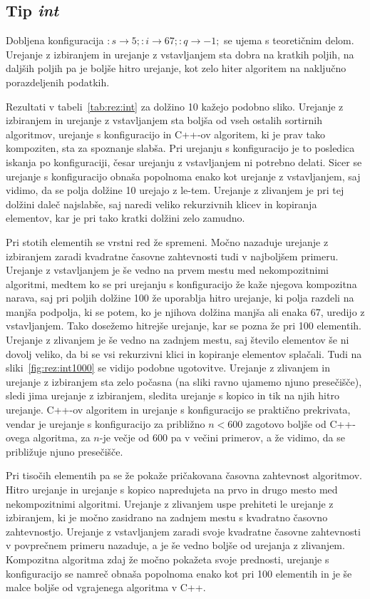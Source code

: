 \documentclass[a4paper,oneside,12pt]{article}
\newcommand{\lra}{\ensuremath{\longrightarrow}}
\begin{document}
\subsection{Tip \emph{int}}
Dobljena konfiguracija $:s \lra 5;:i \lra 67;:q \lra -1;$
se ujema s teoretičnim delom. Urejanje z izbiranjem in urejanje z vstavljanjem sta 
dobra na kratkih poljih, na daljših poljih pa je boljše hitro urejanje, kot zelo hiter algoritem na naključno
porazdeljenih podatkih. 

Rezultati v tabeli~\ref{tab:rez:int} za dolžino 10 kažejo podobno sliko. Urejanje z izbiranjem in urejanje 
z vstavljanjem sta boljša od vseh ostalih sortirnih algoritmov, urejanje s konfiguracijo in C++-ov 
algoritem, ki je prav tako kompoziten, sta za spoznanje slabša. Pri urejanju s konfiguracijo je to posledica
iskanja po konfiguraciji, česar urejanju z vstavljanjem ni potrebno delati. Sicer 
se urejanje s konfiguracijo obnaša popolnoma enako kot urejanje z vstavljanjem, saj vidimo, da se polja dolžine 
10 urejajo z le-tem. Urejanje z zlivanjem je pri tej dolžini daleč najslabše, saj naredi veliko 
rekurzivnih klicev in kopiranja elementov, kar je pri tako kratki dolžini zelo zamudno.

Pri stotih elementih se vrstni red že spremeni. Močno nazaduje urejanje z izbiranjem zaradi 
kvadratne časovne zahtevnosti tudi v najboljšem primeru. Urejanje z vstavljanjem je še vedno 
na prvem mestu med nekompozitnimi algoritmi, medtem ko se pri urejanju s konfiguracijo že kaže njegova
kompozitna narava, saj pri poljih dolžine 100 že uporablja hitro urejanje, ki polja razdeli na 
manjša podpolja, ki se potem, ko je njihova dolžina manjša ali enaka 67, uredijo z vstavljanjem.
Tako dosežemo hitrejše urejanje, kar se pozna že pri 100 elementih. Urejanje z zlivanjem je še 
vedno na zadnjem mestu, saj število elementov še ni dovolj veliko, da bi se vsi rekurzivni klici 
in kopiranje elementov splačali. Tudi na sliki~\ref{fig:rez:int1000} se vidijo
podobne ugotovitve. Urejanje z zlivanjem in urejanje z izbiranjem sta zelo
počasna (na sliki ravno ujamemo njuno presečišče), 
sledi jima urejanje z izbiranjem, sledita urejanje s kopico in tik na
njih hitro urejanje.  C++-ov algoritem in urejanje s konfiguracijo se praktično
prekrivata, vendar je urejanje s konfiguracijo za približno $n < 600$ zagotovo
boljše od C++-ovega algoritma, za $n$-je večje od 600 pa v večini primerov, a že
vidimo, da se približuje njuno presečišče.

Pri tisočih elementih pa se že pokaže pričakovana časovna zahtevnost algoritmov. Hitro urejanje in urejanje
s kopico napredujeta na prvo in drugo mesto med nekompozitnimi algoritmi. Urejanje z zlivanjem uspe 
prehiteti le urejanje z izbiranjem, ki je močno zasidrano na zadnjem mestu s kvadratno časovno 
zahtevnostjo. Urejanje z vstavljanjem zaradi svoje kvadratne časovne zahtevnosti v povprečnem 
primeru nazaduje, a je še vedno boljše od urejanja z zlivanjem.
Kompozitna algoritma zdaj že močno pokažeta svoje prednosti, urejanje s konfiguracijo se namreč 
obnaša popolnoma enako kot pri 100 elementih in je še malce boljše od vgrajenega
algoritma v C++.
\end{document}
